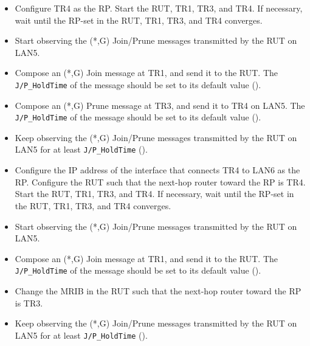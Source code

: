 \documentclass[11pt]{report}
\begin{document}
\begin{itemize}

  \item Configure TR4 as the RP. Start the RUT, TR1, TR3, and TR4. If
  necessary, wait until the RP-set in the RUT, TR1, TR3, and TR4
  converges.

  \item Start observing the (*,G) Join/Prune messages transmitted by the
  RUT on LAN5.

  \item Compose an (*,G) Join message at TR1, and send it to the RUT. 
  The \verb=J/P_HoldTime= of the message should be set to its default
  value ({\PimsmJPHoldTime}).

  \item Compose an (*,G) Prune message at TR3, and send it to TR4 on LAN5.
  The \verb=J/P_HoldTime= of the message should be set to its default
  value ({\PimsmJPHoldTime}).

  \item Keep observing the (*,G) Join/Prune messages transmitted by the
  RUT on LAN5 for at least \verb=J/P_HoldTime= ({\PimsmJPHoldTime}).

\end{itemize}


\begin{itemize}

  \item Configure the IP address of the interface that connects TR4 to LAN6 as
  the RP. Configure the RUT such that the next-hop router toward the RP is
  TR4. Start the RUT, TR1, TR3, and TR4. If necessary, wait until the
  RP-set in the RUT, TR1, TR3, and TR4 converges.

  \item Start observing the (*,G) Join/Prune messages transmitted by the
  RUT on LAN5.

  \item Compose an (*,G) Join message at TR1, and send it to the RUT. 
  The \verb=J/P_HoldTime= of the message should be set to its default
  value ({\PimsmJPHoldTime}).

  \item Change the MRIB in the RUT such that the next-hop
  router toward the RP is TR3.

  \item Keep observing the (*,G) Join/Prune messages transmitted by the
  RUT on LAN5 for at least \verb=J/P_HoldTime= ({\PimsmJPHoldTime}).

\end{itemize}
\end{document}

